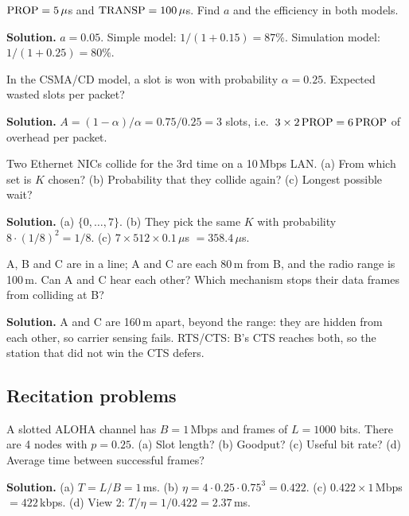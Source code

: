 \begin{example}
$\text{PROP}=5\,\mu$s and $\text{TRANSP}=100\,\mu$s. Find $a$ and the efficiency in both models.

\textbf{Solution.} $a=0.05$. Simple model: $1/(1+0.15)=87\%$. Simulation model: $1/(1+0.25)=80\%$.
\end{example}

\begin{example}
In the CSMA/CD model, a slot is won with probability $\alpha=0.25$. Expected wasted slots per packet?

\textbf{Solution.} $A=(1-\alpha)/\alpha=0.75/0.25=3$ slots, i.e.\ $3\times2\,\text{PROP}=6\,\text{PROP}$ of overhead per packet.
\end{example}

\begin{example}
Two Ethernet NICs collide for the 3rd time on a 10\,Mbps LAN. (a) From which set is $K$ chosen? (b) Probability that they collide again? (c) Longest possible wait?

\textbf{Solution.} (a) $\{0,\dots,7\}$. (b) They pick the same $K$ with probability $8\cdot(1/8)^2=1/8$. (c) $7\times512\times0.1\,\mu$s $=358.4\,\mu$s.
\end{example}

\begin{example}
A, B and C are in a line; A and C are each 80\,m from B, and the radio range is 100\,m. Can A and C hear each other? Which mechanism stops their data frames from colliding at B?

\textbf{Solution.} A and C are 160\,m apart, beyond the range: they are hidden from each other, so carrier sensing fails. RTS/CTS: B's CTS reaches both, so the station that did not win the CTS defers.
\end{example}

\subsection*{Recitation problems}

\begin{example}
A slotted ALOHA channel has $B = 1$\,Mbps and frames of $L = 1000$ bits. There are 4 nodes with $p = 0.25$. (a) Slot length? (b) Goodput? (c) Useful bit rate? (d) Average time between successful frames?

\textbf{Solution.} (a) $T = L/B = 1$\,ms. (b) $\eta = 4\cdot0.25\cdot0.75^3 = 0.422$. (c) $0.422\times1$\,Mbps $=422$\,kbps. (d) View 2: $T/\eta = 1/0.422 = 2.37$\,ms.
\end{example}

